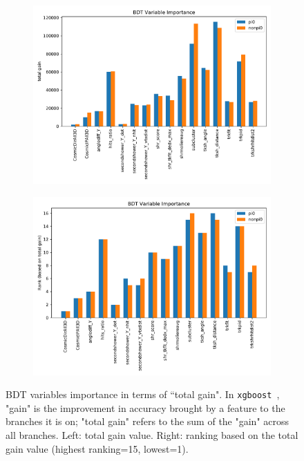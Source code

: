 \begin{figure}[H] 
\begin{center}
    \begin{subfigure}[b]{0.45\textwidth}
    \centering
    \includegraphics[width=1.00\textwidth]{1eNp/bdt_var_gain.pdf}
    \caption{\label{fig:1eNp:bdt:var:gain}}
    \end{subfigure}
    \begin{subfigure}[b]{0.45\textwidth}
    \centering
    \includegraphics[width=1.00\textwidth]{1eNp/bdt_var_rank.pdf}
    \caption{\label{fig:1eNp:bdt:var:rank}}
    \end{subfigure}
\caption{\label{ffig:1eNp:bdt:var} BDT variables importance in terms of ``total gain". In \texttt{xgboost}~\cite{bib:xgboost}, "gain" is the improvement in accuracy brought by a feature to the branches it is on; "total gain" refers to the sum of the "gain" across all branches. Left: total gain value. Right: ranking based on the total gain value (highest ranking=15, lowest=1).}
\end{center}
\end{figure}


